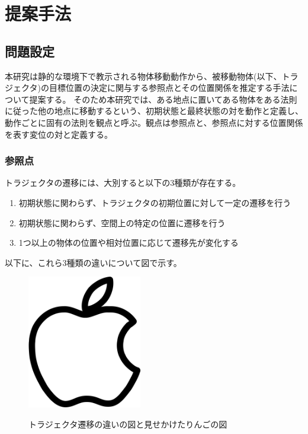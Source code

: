 ﻿%



\chapter{提案手法}

\section{問題設定}

本研究は静的な環境下で教示される物体移動動作から、被移動物体(以下、トラジェクタ)の目標位置の決定に関与する参照点とその位置関係を推定する手法について提案する。
そのため本研究では、ある地点に置いてある物体をある法則に従った他の地点に移動するという、初期状態と最終状態の対を動作と定義し、動作ごとに固有の法則を観点と呼ぶ。観点は参照点と、参照点に対する位置関係を表す変位の対と定義する。

\subsection{参照点}

トラジェクタの遷移には、大別すると以下の3種類が存在する。

	\begin{enumerate}
		\item 初期状態に関わらず、トラジェクタの初期位置に対して一定の遷移を行う
		\item 初期状態に関わらず、空間上の特定の位置に遷移を行う
		\item 1つ以上の物体の位置や相対位置に応じて遷移先が変化する
	\end{enumerate}
以下に、これら3種類の違いについて図で示す。


	\begin{figure}
		\begin{center}
			\includegraphics[width=5cm]{apple.png} \\ %
			\caption{トラジェクタ遷移の違いの図と見せかけたりんごの図}
		\end{center}
	\end{figure}

